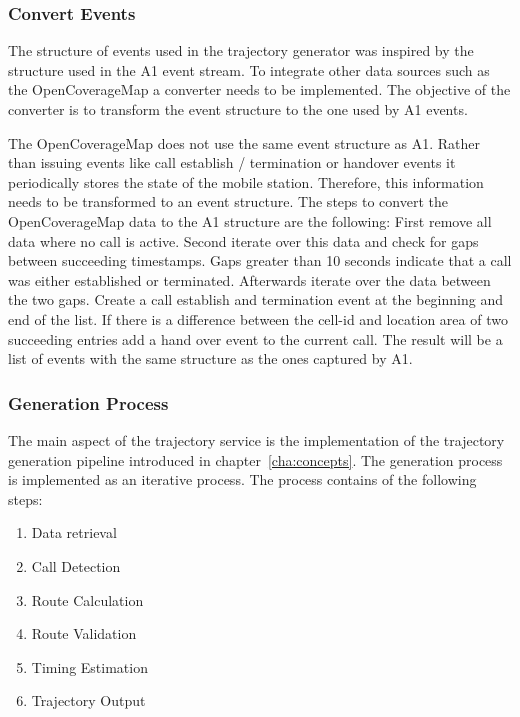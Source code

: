 \subsubsection{Convert Events}
The structure of events used in the trajectory generator was inspired by the structure used in the A1 event stream. To integrate other data sources such as the OpenCoverageMap a converter needs to be implemented. The objective of the converter is to transform the event structure to the one used by A1 events.

The OpenCoverageMap does not use the same event structure as A1. Rather than issuing events like call establish / termination or handover events it periodically stores the state of the mobile station. Therefore, this information needs to be transformed to an event structure. The steps to convert the OpenCoverageMap data to the A1 structure are the following: First remove all data where no call is active. Second iterate over this data and check for gaps between succeeding timestamps. Gaps greater than 10 seconds indicate that a call was either established or terminated. Afterwards iterate over the data between the two gaps. Create a call establish and termination event at the beginning and end of the list. If there is a difference between the cell-id and location area of two succeeding entries add a hand over event to the current call. The result will be a  list of events with the same structure as the ones captured by A1.
\subsubsection{Generation Process}
The main aspect of the trajectory service is the implementation of the trajectory generation pipeline introduced in chapter~\ref{cha:concepts}. The generation process is implemented as an iterative process. The process contains of the following steps:
\begin{enumerate}
\item Data retrieval
\item Call Detection
\item Route Calculation
\item Route Validation
\item Timing Estimation
\item Trajectory Output
\end{enumerate}
